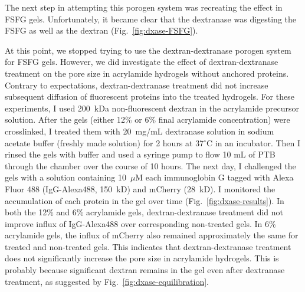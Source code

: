 The next step in attempting this porogen system was recreating the effect in FSFG gels.  Unfortunately, it became clear that the dextranase was digesting the FSFG as well as the dextran (Fig.~\ref{fig:dxase-FSFG}).  

 At this point, we stopped trying to use the dextran-dextranase porogen system for FSFG gels.  However, we did investigate the effect of dextran-dextranase treatment on the pore size in acrylamide hydrogels without anchored proteins.  Contrary to expectations, dextran-dextranase treatment did not increase subsequent diffusion of fluorescent proteins into the treated hydrogels.  For these experiments, I used 200~kDa non-fluorescent dextran in the acrylamide precursor solution.  After the gels (either 12\% or 6\% final acrylamide concentration) were crosslinked, I treated them with 20~mg/mL dextranase solution in sodium acetate buffer (freshly made solution) for 2 hours at 37$^\circ$C in an incubator.  Then I rinsed the gels with buffer and used a syringe pump to flow 10 mL of PTB through the chamber over the course of 10 hours. The next day, I challenged the gels with a solution containing 10~$\mu$M each immunoglobin G tagged with Alexa Fluor 488 (IgG-Alexa488, 150~kD) and mCherry (28~kD).  I monitored the accumulation of each protein in the gel over time (Fig.~\ref{fig:dxase-results}).  In both the 12\% and 6\% acrylamide gels, dextran-dextranase treatment did not improve influx of IgG-Alexa488 over corresponding non-treated gels.  In 6\% acrylamide gels, the influx of mCherry also remained approximately the same for treated and non-treated gels.  This indicates that dextran-dextranase treatment does not significantly increase the pore size in acrylamide hydrogels.  This is probably because significant dextran remains in the gel even after dextranase treatment, as suggested by Fig.~\ref{fig:dxase-equilibration}.

